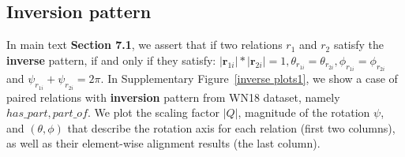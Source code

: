 \documentclass[11pt]{article}
\begin{document}
\subsection{Inversion pattern}
In main text \textbf{Section 7.1}, we assert that if two relations \(r_1\) and \(r_2\) satisfy the \textbf{inverse} pattern, if and only if they satisfy: \(|\textbf{r}_{1i}|*|\textbf{r}_{2i}|=1, \theta_{r_{1i}} = \theta_{r_{2i}}, \phi_{r_{1i}} = \phi_{r_{2i}}\) and \(\psi_{r_{1i}} + \psi_{r_{2i}} = 2\pi\). In Supplementary Figure~\ref{inverse plots1}, we show a case of paired relations with \textbf{inversion} pattern from WN18 dataset, namely \(has\_part, part\_of\). We plot the scaling factor \(|Q|\), magnitude of the rotation \(\psi\), and \((\theta, \phi)\) that describe the rotation axis for each relation (first two columns), as well as their element-wise alignment results (the last column).
\end{document}
